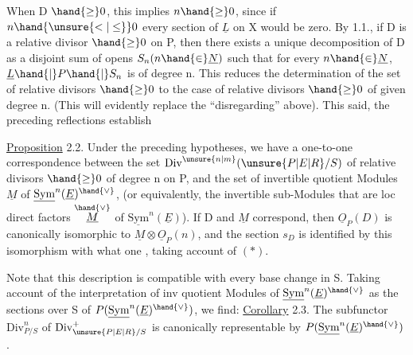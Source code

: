 
When D $\hand{\geq} 0$, this implies $n \hand{\geq} 0$, since if  $n \hand{\unsure{<|\leq}} 0$ every section of
$\underline{L}$ on X would be zero. By 1.1., if D is a relative divisor
$\hand{\geq} 0$ on P, then there exists a unique decomposition of D as a disjoint
sum of opens $S_n (n \hand{\in} \underline{N})$ such that for every $n \hand{\in} \underline{N}$, $\underline{L}\hand{|}P\hand{|}S_n$ is of
degree n. This reduces the determination of the set of relative divisors
$\hand{\geq} 0$ to the case of relative divisors $\hand{\geq} 0$ of given degree n. (This
  will evidently replace the ``disregarding'' above). This said,
the preceding reflections establish

\uline{Proposition} 2.2. Under the preceding hypotheses, we have a one-to-one
correspondence between the set $\mathrm{Div}^{\unsure{n|m}}(\unsure{P|E|R}/S)$ of relative divisors $\hand{\geq} 0$ of
degree n on P, and the set of invertible quotient Modules $\underline{M}$ of
$\underline{\mathrm{Sym}}^{n}(\underline{E})^{\hand{\vee}}$, (or equivalently, the invertible sub-Modules that are loc
direct factors $\overset{\hand{\vee}}{\underline{M}}$ of $\underline{\mathrm{Sym}}^{n}(\underline{E})$). If D and $\underline{M}$ correspond, then
$\underline{O}_P(D)$ is canonically isomorphic to $\underline{M}\otimes\underline{O}_P(n)$, and the section $s_D$ is
identified by this isomorphism with what one , taking account of $(*)$.

Note that this description is compatible with every base
change in S. Taking account of the interpretation of inv quotient Modules of
$\underline{\mathrm{Sym}}^{n}(\underline{E})^{\hand{\vee}}$ as the sections over S of $P(\underline{\mathrm{Sym}}^{n}(\underline{E})^{\hand{\vee}})$, we find:
\uline{Corollary} 2.3. The subfunctor  $\mathrm{Div}^{n}_{P/S}$ of $\mathrm{Div}^{+}_{\unsure{P|E|R}/S}$ is canonically representable
by $P(\underline{\mathrm{Sym}}^{n}(\underline{E})^{\hand{\vee}})$.

